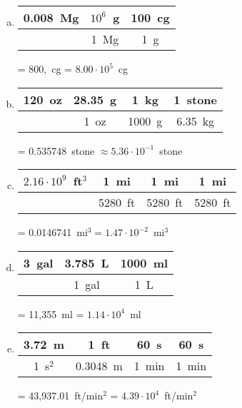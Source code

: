 \documentclass[11pt,letterpaper]{article}
\begin{document}
\sol 
\begin{enumerate}[(a)]
\item \phantom{.}\par
	\begin{table}[H]
	\centering
	\begin{tabular}{c||c|c}
	0.008~Mg & $10^6$~g & 100~cg \\ \hline
			&     1~Mg	    & 1~g
	\end{tabular} = 800,~cg = $8.00 \cdot 10^5$~cg
	\end{table} \pspace

\item \phantom{.}\par
	\begin{table}[H]
	\centering
	\begin{tabular}{c||c|c|c}
	120~oz & 28.35~g & 1~kg & 1~stone \\ \hline
		    & 1~oz 	     & 1000~g & 6.35~kg
	\end{tabular} = 0.535748~stone $\approx 5.36 \cdot 10^{-1}$~stone
	\end{table} \pspace
 
\item \phantom{.}\par
	\begin{table}[H]
	\centering
	\begin{tabular}{c||c|c|c}
	$2.16 \cdot 10^9$~ft$^3$ & 1~mi & 1~mi & 1~mi \\ \hline
						& 5280~ft & 5280~ft & 5280~ft
	\end{tabular} = 0.0146741~mi$^3= 1.47 \cdot 10^{-2}$~mi$^3$
	\end{table} \pspace
 
\item \phantom{.}\par
	\begin{table}[H]
	\centering
	\begin{tabular}{c||c|c}
	3~gal & 3.785~L & 1000~ml \\ \hline
		& 1~gal	  & 1~L
	\end{tabular} = 11,355~ml = $1.14 \cdot 10^4$~ml
	\end{table} \pspace
 
\item \phantom{.}\par
	\begin{table}[H]
	\centering
	\begin{tabular}{c||c|c|c}
	3.72~m   & 1~ft		 & 60~s & 60~s \\ \hline
	1~s$^2$ & 0.3048~m & 1~min & 1~min
	\end{tabular} = 43,937.01~ft/min$^2$ = $4.39 \cdot 10^4$~ft/min$^2$
	\end{table}  
\end{enumerate}
\end{document}
